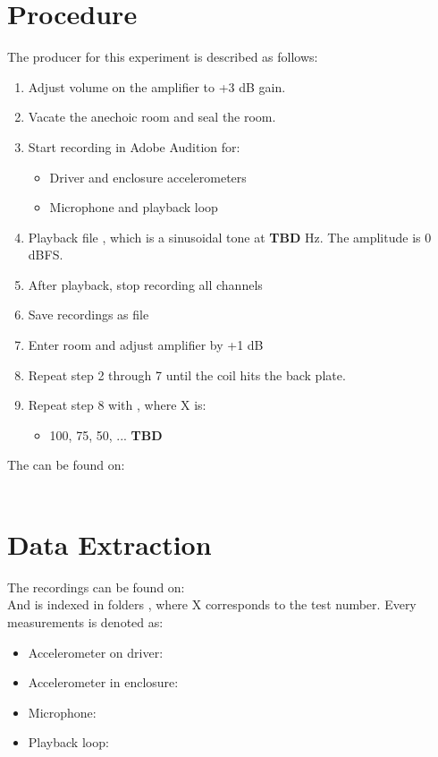 \section{Procedure}\label{sec:SpeakerTestProcedure}

The producer for this experiment is described as follows:
\begin{enumerate}
\item Adjust volume on the amplifier to +3 dB gain.
\item Vacate the anechoic room and seal the room.
\item Start recording in Adobe Audition for:
\begin{itemize}
\item Driver and enclosure accelerometers
\item Microphone and playback loop
\end{itemize}
\item Playback file , which is a sinusoidal tone at \textbf{TBD} Hz. The amplitude is 0 dBFS.
\item After playback, stop recording all channels
\item Save recordings as  file
\item Enter room and adjust amplifier by +1 dB
\item Repeat step 2 through 7 until the coil hits the back plate.
\item Repeat step 8 with , where X is:
\begin{itemize}
\item 100, 75, 50, ... \textbf{TBD}
\end{itemize}
\end{enumerate}

The  can be found on:\\
\\

\section{Data Extraction}

The recordings can be found on:\\
And is indexed in folders , where X corresponds to the test number. Every measurements is denoted as:
\begin{itemize}
\item Accelerometer on driver: 
\item Accelerometer in enclosure: 
\item Microphone: 
\item Playback loop: 
\end{itemize}


